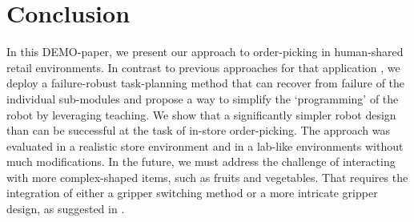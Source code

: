 \section{Conclusion} 
\label{sec:rss24_conclusion}

In this DEMO-paper, we present our approach to order-picking in human-shared
retail environments. In contrast to previous approaches for that application
\cite{toyota2023}, we deploy a failure-robust task-planning method that can
recover from failure of the individual sub-modules and propose a way to simplify
the `programming' of the robot by leveraging teaching. We show that a
significantly simpler robot design than \cite{toyota2023} can be successful at
the task of in-store order-picking. The approach was evaluated in a realistic store environment
and in a lab-like environments without much modifications. In the future, we
must address the challenge of interacting with more complex-shaped items, such
as fruits and vegetables. That requires the integration of either a gripper
switching method or a more intricate gripper design, as suggested in
\cite{toyota2023}.



